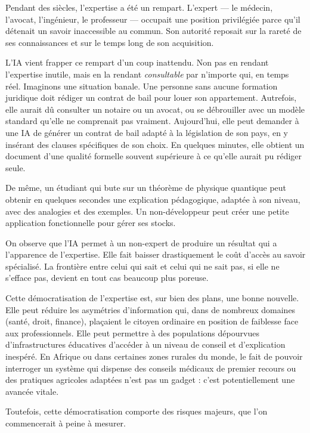 
Pendant des siècles, l'expertise a été un rempart. L'expert — le médecin, l'avocat, l'ingénieur, le professeur — occupait une position privilégiée parce qu'il détenait un savoir inaccessible au commun. Son autorité reposait sur la rareté de ses connaissances et sur le temps long de son acquisition.

L'IA vient frapper ce rempart d'un coup inattendu. Non pas en rendant l'expertise inutile, mais en la rendant \emph{consultable} par n'importe qui, en temps réel. Imaginons une situation banale. Une personne sans aucune formation juridique doit rédiger un contrat de bail pour louer son appartement. Autrefois, elle aurait dû consulter un notaire ou un avocat, ou se débrouiller avec un modèle standard qu'elle ne comprenait pas vraiment. Aujourd'hui, elle peut demander à une IA de générer un contrat de bail adapté à la législation de son pays, en y insérant des clauses spécifiques de son choix. En quelques minutes, elle obtient un document d'une qualité formelle souvent supérieure à ce qu'elle aurait pu rédiger seule.

De même, un étudiant qui bute sur un théorème de physique quantique peut obtenir en quelques secondes une explication pédagogique, adaptée à son niveau, avec des analogies et des exemples. Un non-développeur peut créer une petite application fonctionnelle pour gérer ses stocks.

On observe que l'IA permet à un non-expert de produire un résultat qui a l'apparence de l'expertise. Elle fait baisser drastiquement le coût d'accès au savoir spécialisé. La frontière entre celui qui sait et celui qui ne sait pas, si elle ne s'efface pas, devient en tout cas beaucoup plus poreuse.

Cette démocratisation de l'expertise est, sur bien des plans, une bonne nouvelle. Elle peut réduire les asymétries d'information qui, dans de nombreux domaines (santé, droit, finance), plaçaient le citoyen ordinaire en position de faiblesse face aux professionnels. Elle peut permettre à des populations dépourvues d'infrastructures éducatives d'accéder à un niveau de conseil et d'explication inespéré. En Afrique ou dans certaines zones rurales du monde, le fait de pouvoir interroger un système qui dispense des conseils médicaux de premier recours ou des pratiques agricoles adaptées n'est pas un gadget : c'est potentiellement une avancée vitale.

Toutefois, cette démocratisation comporte des risques majeurs, que l'on commencerait à peine à mesurer.

